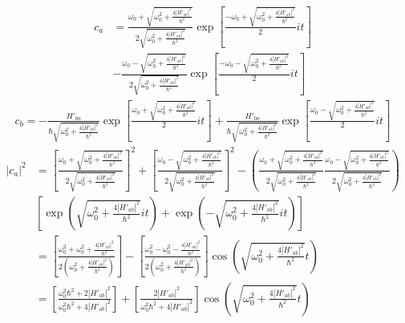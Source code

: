 \begin{align*}
    c_a & =
    \frac{\omega_0 + \sqrt{\omega_0^2 + \frac{4|H'_{ab}|^2}{\hbar^2}}}{2\sqrt{\omega_0^2 + \frac{4|H'_{ab}|^2}{\hbar^2}}}
    \exp\left[\frac{ -\omega_0  + \sqrt{\omega_0^2 + \frac{4|H'_{ab}|^2}{\hbar^2}}}{2} it\right]
    \\ & -
    \frac{\omega_0 - \sqrt{\omega_0^2 + \frac{4|H'_{ab}|^2}{\hbar^2}}}{2\sqrt{\omega_0^2 + \frac{4|H'_{ab}|^2}{\hbar^2}}}
    \exp\left[\frac{-\omega_0 - \sqrt{\omega_0^2 + \frac{4|H'_{ab}|^2}{\hbar^2}}}{2} it\right]
\end{align*}
\begin{align*}
    c_b = -\frac{H'_{ba}}{\hbar\sqrt{\omega^2_0 + \frac{4|H'_{ab}|^2}{\hbar^2}}}\exp\left[\frac{\omega_0 + \sqrt{\omega_0^2 + \frac{4|H'_{ab}|^2}{\hbar^2}}}{2} it\right]
    + \frac{H'_{ba}}{\hbar\sqrt{\omega^2_0 + \frac{4|H'_{ab}|^2}{\hbar^2}}}\exp\left[\frac{\omega_0 - \sqrt{\omega_0^2 + \frac{4|H'_{ab}|^2}{\hbar^2}}}{2} it\right]
\end{align*}
\begin{align*}
    |c_a|^2 & =
    \left[\frac{\omega_0 + \sqrt{\omega_0^2 + \frac{4|H'_{ab}|^2}{\hbar^2}}}{2\sqrt{\omega_0^2 + \frac{4|H'_{ab}|^2}{\hbar^2}}}\right]^2
    +\left[\frac{\omega_0 - \sqrt{\omega_0^2 + \frac{4|H'_{ab}|^2}{\hbar^2}}}{2\sqrt{\omega_0^2 + \frac{4|H'_{ab}|^2}{\hbar^2}}}\right]^2
    -
    \left(
    \frac{\omega_0 + \sqrt{\omega_0^2 + \frac{4|H'_{ab}|^2}{\hbar^2}}}{2\sqrt{\omega_0^2 + \frac{4|H'_{ab}|^2}{\hbar^2}}}
    \frac{\omega_0 - \sqrt{\omega_0^2 + \frac{4|H'_{ab}|^2}{\hbar^2}}}{2\sqrt{\omega_0^2 + \frac{4|H'_{ab}|^2}{\hbar^2}}}
    \right) \\
            & \left[
                  \exp\left(
                  \sqrt{\omega_0^2 + \frac{4|H'_{ab}|^2}{\hbar^2}} it
                  \right) +
                  \exp\left(-
                  \sqrt{\omega_0^2 + \frac{4|H'_{ab}|^2}{\hbar^2}} it\right)
                  \right]
    \\ &
    = \left[\frac{\omega_0 ^2+ \omega_0^2 + \frac{4|H'_{ab}|^2}{\hbar^2}}{ 2\left(\omega_0^2 + \frac{4|H'_{ab}|^2}{\hbar^2}\right)}\right]
    -
    \left[\frac{\omega_0 ^2- \omega_0^2 - \frac{4|H'_{ab}|^2}{\hbar^2}}{ 2\left(\omega_0^2 + \frac{4|H'_{ab}|^2}{\hbar^2}\right)}\right]
    \cos\left( \sqrt{\omega_0^2 + \frac{4|H'_{ab}|^2}{\hbar^2}} t\right) \\
            & =
    \left[\frac{\omega_0 ^2\hbar^2+   2|H'_{ab}|^2}{ \omega_0^2\hbar^2 + 4|H'_{ab}|^2}\right]
    +
    \left[\frac{  2|H'_{ab}|^2}{ \omega_0^2\hbar^2 + 4|H'_{ab}|^2}\right]
    \cos\left( \sqrt{\omega_0^2 + \frac{4|H'_{ab}|^2}{\hbar^2}} t\right)
\end{align*}

